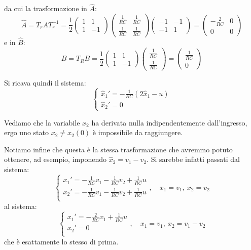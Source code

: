 \documentclass[a4paper,11pt]{article}
\begin{document}
da cui la trasformazione in $\hat{A}$:
$$
\hat{A} = T_r A T_r^{-1} = \frac{1}{2} \begin{pmatrix}
	1 & 1 \\
	1 & -1
\end{pmatrix} \begin{pmatrix}
	\frac{1}{RC} & \frac{1}{RC} \\ 
	\frac{1}{RC} & \frac{1}{RC} 
\end{pmatrix}
\begin{pmatrix}
	-1 & -1 \\
	-1 & 1
\end{pmatrix} = \begin{pmatrix}
	-\frac{2}{RC} & 0 \\
	0 & 0
\end{pmatrix}
$$
e in $\hat{B}$:
$$
\hat{B} = T_R B = \frac{1}{2} \begin{pmatrix}
	1 & 1 \\ 
	1 & -1
\end{pmatrix} \begin{pmatrix}
	\frac{1}{RC} \\ \frac{1}{RC}
\end{pmatrix} = \begin{pmatrix}
	\frac{1}{RC} \\ 0
\end{pmatrix}
$$

Si ricava quindi il sistema:
\[
	\begin{cases}
		\hat{x}_1' = -\frac{1}{RC} (2\hat{x}_1 - u) \\
		\hat{x}_2' = 0
	\end{cases}
\]

Vediamo che la variabile $x_2$ ha derivata nulla indipendentemente dall'ingresso, ergo uno stato $x_2 \neq x_2(0)$ è impossibile da raggiungere.

Notiamo infine che questa è la stessa trasformazione che avremmo potuto ottenere, ad esempio, imponendo $\hat{x}_2 = v_1 - v_2$.
Si sarebbe infatti passati dal sistema:
\[
	\begin{cases}
		x_1' = -\frac{1}{RC} v_1 - \frac{1}{RC} v_2 + \frac{1}{RC} u \\	
		x_2' = -\frac{1}{RC} v_1 - \frac{1}{RC} v_2 + \frac{1}{RC} u \\	
	\end{cases}, \quad 
	x_1 = v_1, \ x_2 = v_2
\]
al sistema:
\[
	\begin{cases}
		x_1' = -\frac{2}{RC} v_1 + \frac{1}{RC} u \\	
		x_2' = 0 \\	
	\end{cases}, \quad 
	x_1 = v_1, \ x_2 = v_1 - v_2
\]
che è esattamente lo stesso di prima.
\end{document}
